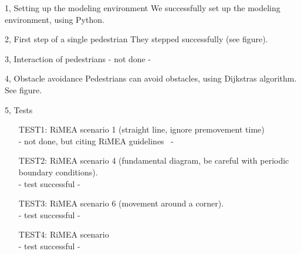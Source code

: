 \documentclass[10pt,a4paper]{article}
\begin{document}
\frontpage

\begin{task}{1, Setting up the modeling environment}
We successfully set up the modeling environment, using Python.

\end{task}

\begin{task}{2, First step of a single pedestrian}
They stepped successfully (see figure).
\end{task}

\begin{task}{3, Interaction of pedestrians}
- not done -
\end{task}
\begin{task}{4, Obstacle avoidance}
Pedestrians can avoid obstacles, using Dijkstras algorithm. See figure.
\end{task}
\begin{task}{5, Tests}
\begin{enumerate}
\item[TEST1:] RiMEA scenario 1 (straight line, ignore premovement time)\\
- not done, but citing RiMEA guidelines~\cite{rimea-2009} -
\item[TEST2:] RiMEA scenario 4 (fundamental diagram, be careful with periodic boundary conditions).\\
- test successful - 
\item[TEST3:] RiMEA scenario 6 (movement around a corner).\\
- test successful - 
\item[TEST4:] RiMEA scenario\\
- test successful - 
\end{enumerate}
\end{task}



\end{document}

